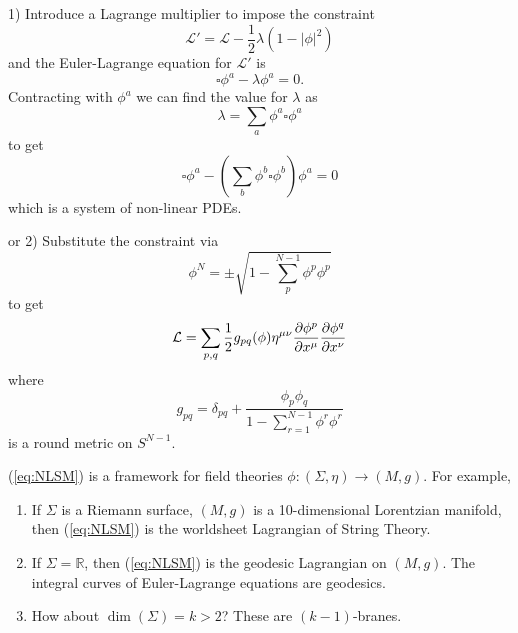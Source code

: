 \documentclass[a4paper,11pt]{article}
\begin{document}
    1) Introduce a Lagrange multiplier to impose the constraint
    \begin{equation}
        \mathcal{L}' = \mathcal{L} - \frac{1}{2} \lambda (1 - |\phi|^2) 
    \end{equation}
    and the Euler-Lagrange equation for $\mathcal{L}'$ is 
    \begin{equation}
        \square \phi^a - \lambda \phi^a = 0.
    \end{equation}
    Contracting with $\phi^a$ we can find the value for $\lambda$ as 
    \begin{equation}
        \lambda = \sum_a \phi^a \square \phi^a
    \end{equation}
    to get 
    \begin{equation}
        \square \phi^a - \left( \sum_b \phi^b \square \phi^b \right) \phi^a = 0 \label{eq:sigma-eom}
    \end{equation}
    which is a system of non-linear PDEs.

    or 2) Substitute the constraint via 
    \begin{equation}
        \phi^N = \pm \sqrt{1 - \sum_p^{N-1} \phi^p \phi^p}
    \end{equation}
    to get 
    \begin{equation}
        \mathcal{L} = \sum_{p,q}\frac{1}{2} g_{pq}(\phi) \eta^{\mu \nu} \pdv{\phi^p}{x^\mu} \pdv{\phi^q}{x^\nu} \label{eq:NLSM}
    \end{equation}
    where 
    \begin{equation}
        g_{pq} = \delta_{pq} + \frac{\phi_p \phi_q}{1 - \sum_{r=1}^{N-1} \phi^r \phi^r}
    \end{equation}
    is a round metric on $S^{N-1}$.

    \begin{rmk}
        (\ref{eq:NLSM}) is a framework for field theories $\phi: (\Sigma, \eta) \to (M,g)$. For example, 
        \begin{enumerate}
            \item If $\Sigma$ is a Riemann surface, $(M,g)$ is a 10-dimensional Lorentzian manifold, then (\ref{eq:NLSM}) is the worldsheet Lagrangian of String Theory.
            \item If $\Sigma = \mathbb{R}$, then (\ref{eq:NLSM}) is the geodesic Lagrangian on $(M,g)$. The integral curves of Euler-Lagrange equations are geodesics. 
            \item How about $\dim(\Sigma) = k > 2$? These are $(k-1)$-branes.
        \end{enumerate}
    \end{rmk}
\end{document}
